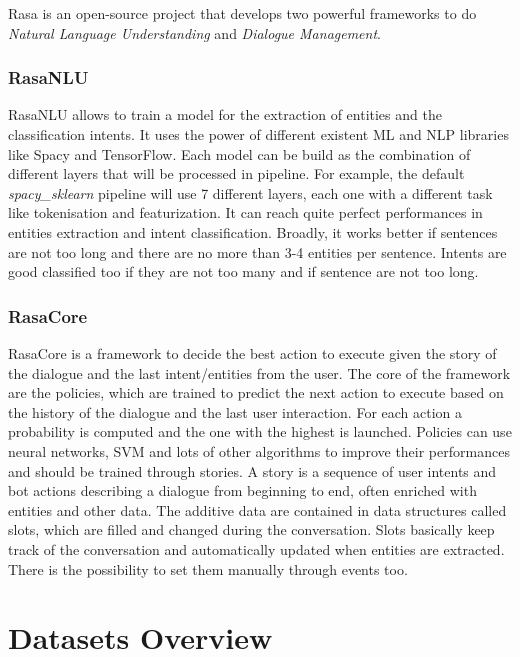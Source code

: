 \documentclass[11pt,a4paper]{article}
\begin{document}
Rasa is an open-source project that develops two powerful frameworks to do \textit{Natural Language Understanding} and \textit{Dialogue Management}. 

\subsubsection{RasaNLU}

RasaNLU allows to train a model for the extraction of entities and the classification intents. It uses the power of different existent ML and NLP libraries like Spacy and TensorFlow. Each model can be build as the combination of different layers that will be processed in pipeline. For example, the default \textit{spacy\_sklearn} pipeline will use 7 different layers, each one with a different task like tokenisation and featurization. It can reach quite perfect performances in entities extraction and intent classification. Broadly, it works better if sentences are not too long and there are no more than 3-4 entities per sentence. Intents are good classified too if they are not too many and if sentence are not too long.

\subsubsection{RasaCore}

RasaCore is a framework to decide the best action to execute given the story of the dialogue and the last intent/entities from the user. The core of the framework are the policies, which are trained to predict the next action to execute based on the history of the dialogue and the last user interaction. For each action a probability is computed and the one with the highest is launched. Policies can use neural networks, SVM and lots of other algorithms to improve their performances and should be trained through stories. A story is a sequence of user intents and bot actions describing a dialogue from beginning to end, often enriched with entities and other data. The additive data are contained in data structures called slots, which are filled and changed during the conversation. Slots basically keep track of the conversation and automatically updated when entities are extracted. There is the possibility to set them manually through events too.

\section{Datasets Overview}
\end{document}
